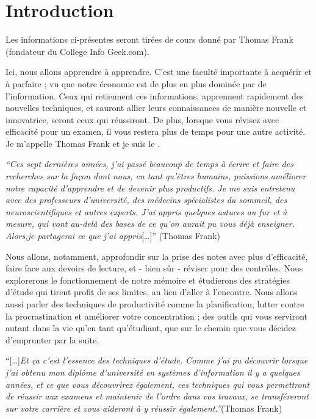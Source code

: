 \hypertarget{introduction}{%
\section{Introduction}\label{introduction}}

Les informations ci-présentes seront tirées de cours donné par Thomas
Frank (fondateur du College Info Geek.com).

Ici, nous allons apprendre à apprendre. C'est une faculté importante à
acquérir et à parfaire ; vu que notre économie est de plus en plus
dominée par de l'information. Ceux qui retiennent ces informations,
apprennent rapidement des nouvelles techniques, et sauront allier leurs
connaissances de manière nouvelle et innovatrice, seront ceux qui
réussiront. De plus, lorsque vous révisez avec efficacité pour un
examen, il vous restera plus de temps pour une autre activité. Je
m'appelle Thomas Frank et je suis le .

\emph{``Ces sept dernières années, j'ai passé beaucoup de temps à écrire
et faire des recherches sur la façon dont nous, en tant qu'êtres
humains, puissions améliorer notre capacité d'apprendre et de devenir
plus productifs. Je me suis entretenu avec des professeurs d'université,
des médecins spécialistes du sommeil, des neuroscientifiques et autres
experts. J'ai appris quelques astuces au fur et à mesure, qui vont
au-delà des bases de ce qu'on aurait pu vous déjà enseigner. Alors,je
partagerai ce que j'ai appris}{[}\ldots{]}'' (Thomas Frank)

Nous allons, notamment, approfondir sur la prise des notes avec plus
d'efficacité, faire face aux devoirs de lecture, et - bien sûr - réviser
pour des contrôles. Nous explorerons le fonctionnement de notre mémoire
et étudierons des stratégies d'étude qui tirent profit de ses limites,
au lieu d'aller à l'encontre. Nous allons aussi parler des techniques de
productivité comme la planification, lutter contre la procrastination et
améliorer votre concentration ; des outils qui vous serviront autant
dans la vie qu'en tant qu'étudiant, que sur le chemin que vous décidez
d'emprunter par la suite.

``{[}\ldots{]}\emph{Et ça c'est l'essence des techniques d'étude. Comme
j'ai pu découvrir lorsque j'ai obtenu mon diplôme d'université en
systèmes d'information il y a quelques années, et ce que vous
découvrirez également, ces techniques qui vous permettront de réussir
aux examens et maintenir de l'ordre dans vos travaux, se transféreront
sur votre carrière et vous aideront à y réussir également.''}(Thomas
Frank)

